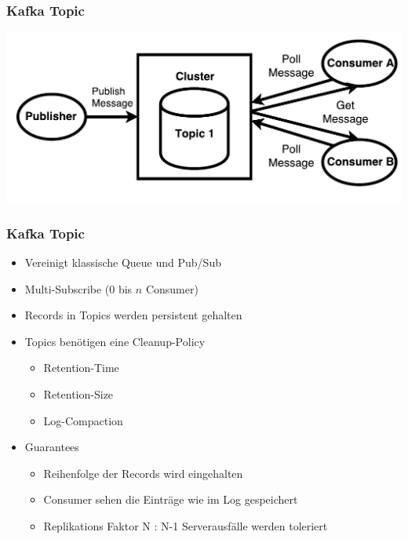\begin{frame}
\frametitle{Kafka Topic}
\centering
\includegraphics[scale=0.6]{figure/Kafka_topic_draw_Poll.pdf}
\end{frame}


\begin{frame}
\frametitle{Kafka Topic}
\begin{itemize}
	\item Vereinigt klassische Queue und Pub/Sub
	\item Multi-Subscribe ($0$ bis $n$ Consumer)		%
	\item Records in Topics werden persistent gehalten
	\item Topics benötigen eine Cleanup-Policy
		\begin{itemize}
			\item Retention-Time
			\item Retention-Size
			\item Log-Compaction
		\end{itemize}
	\item Guarantees
		\begin{itemize}
			\item Reihenfolge der Records wird eingehalten
			\item Consumer sehen die Einträge wie im Log gespeichert
			\item Replikations Faktor N : N-1 Serverausfälle werden toleriert
		\end{itemize}
\end{itemize}
\end{frame}

